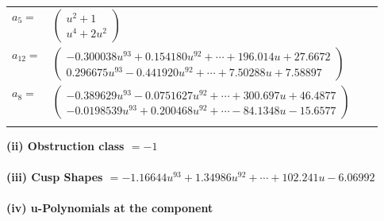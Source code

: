 \documentclass[1p]{elsarticle_modified}
\theoremstyle{definition}
\begin{document}
\begin{tabular}{m{7pt} m{180pt} m{7pt} m{180pt} }
\flushright $a_{5}=$&$\begin{pmatrix}u^2+1\\u^4+2 u^2\end{pmatrix}$ \\
\flushright $a_{12}=$&$\begin{pmatrix}-0.300038 u^{93}+0.154180 u^{92}+\cdots+196.014 u+27.6672\\0.296675 u^{93}-0.441920 u^{92}+\cdots+7.50288 u+7.58897\end{pmatrix}$ \\
\flushright $a_{8}=$&$\begin{pmatrix}-0.389629 u^{93}-0.0751627 u^{92}+\cdots+300.697 u+46.4877\\-0.0198539 u^{93}+0.200468 u^{92}+\cdots-84.1348 u-15.6577\end{pmatrix}$\\&\end{tabular}
\flushleft \textbf{(ii) Obstruction class $= -1$}\\~\\
\flushleft \textbf{(iii) Cusp Shapes $= -1.16644 u^{93}+1.34986 u^{92}+\cdots+102.241 u-6.06992$}\\~\\
\newpage\renewcommand{\arraystretch}{1}
\flushleft \textbf{(iv) u-Polynomials at the component}\newline \\
\end{document}
